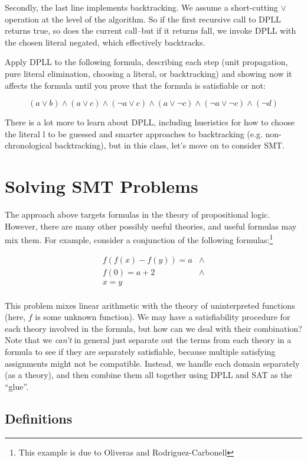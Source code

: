 \documentclass[11pt]{article}
\begin{document}
Secondly, the last line implements backtracking. We assume a short-cutting
$\lor$ operation at the level of the algorithm. So if the first recursive call
to DPLL returns true, so does the current call--but if it returns fall, we
invoke DPLL with the chosen literal negated, which effectively backtracks.

 Apply DPLL to the following formula, describing each step (unit
propagation, pure literal elimination, choosing a literal, or backtracking) and
showing now it affects the formula until you prove that the formula is
satisfiable or not:

\[
(a \lor b) \land (a \lor c) \land (\lnot a \lor c) \land (a \lor \lnot c) \land (\lnot a \lor \lnot c) \land (\lnot d)
\]

There is a lot more to learn about DPLL, including hueristics for how to choose
the literal l to be guessed and smarter approaches to backtracking (e.g.
non-chronological backtracking), but in this class, let's move on to consider
SMT.


\section{Solving SMT Problems}

The approach above targets formulas in the theory of propositional logic.
However, there are many other possibly useful theories, and useful formulas
may mix them. For example, consider a conjunction of the following
formulas:\footnote{This example is due to Oliveras and Rodriguez-Carbonell}

\[
\begin{array}{ll}
f(f(x)-f(y)) = a & \land \\
f(0) = a+2 & \land \\
x = y & \\
\end{array}
\]

This problem mixes linear arithmetic with the theory of uninterpreted functions
(here, $f$ is some unknown function). We may have a satisfiability procedure for
each theory involved in the formula, but how can we deal with their combination?
Note that we \emph{can't} in general just separate out the terms from each
theory in a formula to see if they are separately satisfiable, because multiple
satisfying assignments might not be compatible.  Instead, we handle each
domain separately (as a theory), and then combine them all together using DPLL
and SAT as the ``glue''. 

\subsection{Definitions} 
\end{document}
